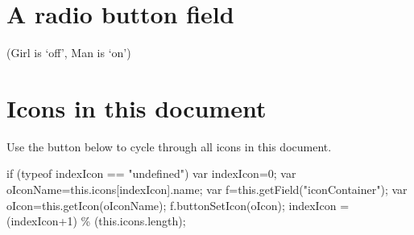 \documentclass{article}
\begin{document}
\section{A radio button field}

\quad {}\quad{}\quad(Girl is `off', Man is `on')\hfill
{}


\section{Icons in this document}

Use the button below to cycle through all icons in this document.

\begin{defineJS}{\cycleJS}
if (typeof indexIcon == "undefined") var indexIcon=0;
var oIconName=this.icons[indexIcon].name;
var f=this.getField("iconContainer");
var oIcon=this.getIcon(oIconName);
f.buttonSetIcon(oIcon);
indexIcon = (indexIcon+1) \% (this.icons.length);
\end{defineJS}

\begin{center}
\vcgBdry[6bp]
\end{center}
\end{document}
